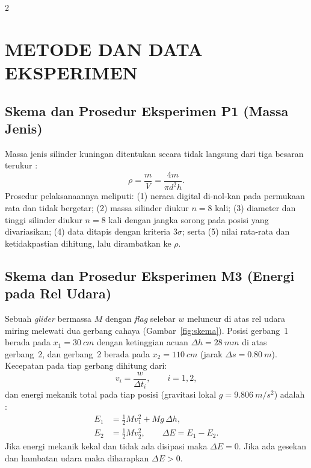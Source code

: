 \documentclass[a4paper, 12pt]{article}
\begin{document}
\begin{multicols}{2}
    \raggedcolumns
    \section{METODE DAN DATA EKSPERIMEN}
        \subsection{Skema dan Prosedur Eksperimen P1 (Massa Jenis)}
        Massa jenis silinder kuningan ditentukan secara tidak langsung dari tiga besaran terukur \parencite{HallidayResnickWalker}:
        \begin{equation}
            \rho=\frac{m}{V}=\frac{4m}{\pi d^{2}h}.
            \label{eq:rho}
        \end{equation}
        Prosedur pelaksanaannya meliputi: (1) neraca digital di-nol-kan pada permukaan rata dan tidak bergetar; (2) massa silinder diukur $n=8$ kali; (3) diameter dan tinggi silinder diukur $n=8$ kali dengan jangka sorong pada posisi yang divariasikan; (4) data ditapis dengan kriteria $3\sigma$; serta (5) nilai rata-rata dan ketidakpastian dihitung, lalu dirambatkan ke $\rho$.

        \subsection{Skema dan Prosedur Eksperimen M3 (Energi pada Rel Udara)}
        Sebuah \textit{glider} bermassa $M$ dengan \textit{flag} selebar $w$ meluncur di atas rel udara miring melewati dua gerbang cahaya (Gambar~\ref{fig:skema}). Posisi gerbang~1 berada pada $x_1=\SI{30}{cm}$ dengan ketinggian acuan $\Delta h=\SI{28}{mm}$ di atas gerbang~2, dan gerbang~2 berada pada $x_2=\SI{110}{cm}$ (jarak $\Delta s=\SI{0,80}{m}$). Kecepatan pada tiap gerbang dihitung dari:
        \begin{equation}
            v_i=\frac{w}{\Delta t_i},\qquad i=1,2,
            \label{eq:v}
        \end{equation}
        dan energi mekanik total pada tiap posisi (gravitasi lokal $g=\SI{9,806}{m/s^2}$) adalah \parencite{HallidayResnickWalker}:
        \begin{equation}
            \begin{aligned}
                E_1 &= \tfrac{1}{2}Mv_1^{2}+Mg\,\Delta h, \\
                E_2 &= \tfrac{1}{2}Mv_2^{2},\qquad \Delta E=E_1-E_2.
            \end{aligned}
            \label{eq:E}
        \end{equation}
        Jika energi mekanik kekal dan tidak ada disipasi maka $\Delta E=0$. Jika ada gesekan dan hambatan udara maka diharapkan $\Delta E>0$.
\end{multicols}
\end{document}
